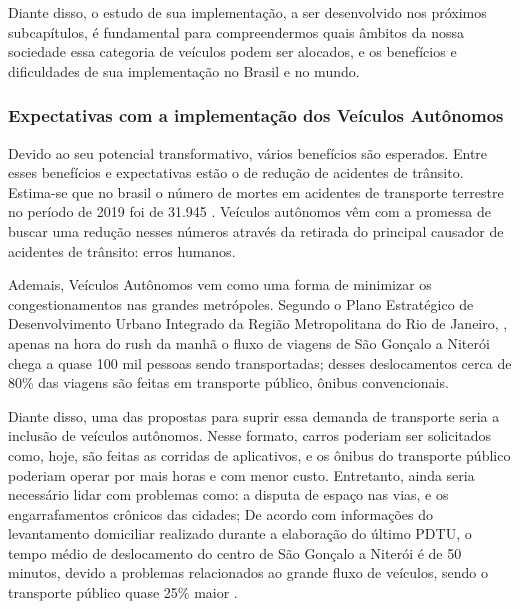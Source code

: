 Diante disso, o estudo de sua implementação, a ser desenvolvido nos próximos subcapítulos, é fundamental para compreendermos quais âmbitos da nossa sociedade essa categoria de veículos podem ser alocados, e os benefícios e dificuldades de sua implementação no Brasil e no mundo.

 \subsubsection{Expectativas com a implementação dos Veículos Autônomos}
Devido ao seu potencial transformativo, vários benefícios são esperados. Entre esses benefícios e expectativas estão o de redução de acidentes de trânsito. Estima-se que no brasil o número de mortes em acidentes de transporte terrestre no período de 2019 foi de 31.945 \cite{Anexo_I_pnatrans}. Veículos autônomos vêm com a promessa de buscar uma redução nesses números através da retirada do principal causador de acidentes de trânsito: erros humanos. 

Ademais, Veículos Autônomos vem como uma forma de minimizar os congestionamentos nas grandes metrópoles. Segundo o  Plano Estratégico de Desenvolvimento Urbano Integrado da Região Metropolitana do Rio de Janeiro, \cite{rj_transito}, apenas na hora do rush da manhã o fluxo de viagens de São Gonçalo a Niterói chega a quase 100 mil pessoas sendo transportadas; desses deslocamentos cerca de 80\% das viagens são feitas em transporte público, ônibus convencionais. 

Diante disso, uma das propostas para suprir essa demanda de transporte seria a inclusão de veículos autônomos. Nesse formato, carros poderiam ser solicitados como, hoje, são feitas as corridas de aplicativos, e os ônibus do transporte público  poderiam operar por mais horas e com menor custo. 
Entretanto, ainda seria necessário lidar com problemas como: a disputa de espaço nas vias, e os engarrafamentos crônicos das cidades; De acordo com informações do levantamento domiciliar realizado durante a elaboração do último PDTU, o tempo médio de deslocamento do centro de São Gonçalo a Niterói é de 50 minutos, devido a problemas relacionados ao grande fluxo de veículos, sendo o transporte público quase 25\% maior \cite{rj_transito}.

